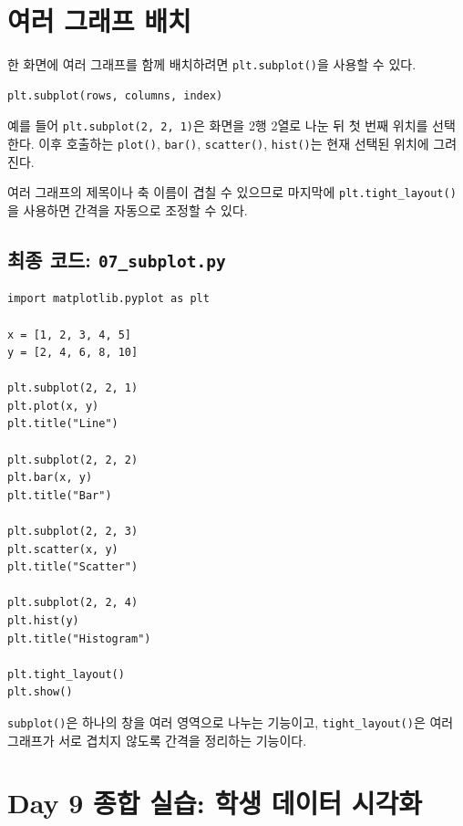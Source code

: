 \documentclass[11pt,a4paper]{article}
\begin{document}
\section{여러 그래프 배치}

한 화면에 여러 그래프를 함께 배치하려면 \texttt{plt.subplot()}을 사용할 수 있다.

\begin{lstlisting}
plt.subplot(rows, columns, index)
\end{lstlisting}

예를 들어 \texttt{plt.subplot(2, 2, 1)}은 화면을 2행 2열로 나눈 뒤 첫 번째 위치를 선택한다. 이후 호출하는 \texttt{plot()}, \texttt{bar()}, \texttt{scatter()}, \texttt{hist()}는 현재 선택된 위치에 그려진다.

여러 그래프의 제목이나 축 이름이 겹칠 수 있으므로 마지막에 \texttt{plt.tight\_layout()}을 사용하면 간격을 자동으로 조정할 수 있다.

\subsection{최종 코드: \texttt{07\_subplot.py}}

\begin{lstlisting}
import matplotlib.pyplot as plt

x = [1, 2, 3, 4, 5]
y = [2, 4, 6, 8, 10]

plt.subplot(2, 2, 1)
plt.plot(x, y)
plt.title("Line")

plt.subplot(2, 2, 2)
plt.bar(x, y)
plt.title("Bar")

plt.subplot(2, 2, 3)
plt.scatter(x, y)
plt.title("Scatter")

plt.subplot(2, 2, 4)
plt.hist(y)
plt.title("Histogram")

plt.tight_layout()
plt.show()
\end{lstlisting}

\begin{importantbox}
\texttt{subplot()}은 하나의 창을 여러 영역으로 나누는 기능이고, \texttt{tight\_layout()}은 여러 그래프가 서로 겹치지 않도록 간격을 정리하는 기능이다.
\end{importantbox}

\section{Day 9 종합 실습: 학생 데이터 시각화}
\end{document}
